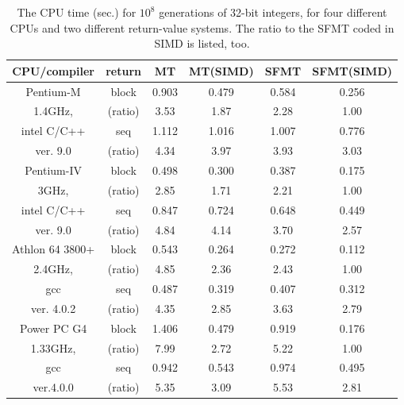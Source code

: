 \documentclass[acmnow]{acmtrans2m}
\begin{document}
\begin{table}
\begin{center}
\begin{tabular}{|c|c||c|c|c|c|}
\hline
CPU/compiler & return & MT & MT(SIMD) & SFMT & SFMT(SIMD)  \\ \hline \hline
Pentium-M  & block   & 0.903 & 0.479 & 0.584 &0.256  \\ 
\cline{3-6}
 1.4GHz, & (ratio) & 3.53\phantom{0}  & 1.87\phantom{0}  & 2.28\phantom{0}  & 1.00\phantom{0}\\ 
\cline{2-6}
 intel C/C++ &  seq     & 1.112 & 1.016 & 1.007 & 0.776 \\ 
\cline{3-6}
 ver. 9.0 & (ratio) & 4.34\phantom{0} & 3.97\phantom{0}  & 3.93\phantom{0}  & 3.03\phantom{0} \\ 
\hline
 Pentium-IV & block & 0.498 & 0.300 & 0.387 & 0.175 \\ 
\cline{3-6}
 3GHz, & (ratio)& 2.85\phantom{0} & 1.71\phantom{0}  & 2.21\phantom{0}
  & 1.00\phantom{0}  \\ 
\cline{2-6}
 intel C/C++ & seq   & 0.847 & 0.724 & 0.648 & 0.449 \\
\cline{3-6}
 ver. 9.0 & (ratio)& 4.84\phantom{0} & 4.14\phantom{0}  & 3.70\phantom{0}
  & 2.57\phantom{0}  \\ 
\hline
 Athlon 64 3800+& block & 0.543 & 0.264 & 0.272 & 0.112 \\
\cline{3-6}
 2.4GHz, & (ratio)& 4.85\phantom{0} & 2.36\phantom{0}  & 2.43\phantom{0} & 1.00\phantom{0} \\ 
\cline{2-6}
 gcc & seq & 0.487 & 0.319 & 0.407 & 0.312  \\ 
\cline{3-6}
 ver. 4.0.2 & (ratio)& 4.35\phantom{0} & 2.85\phantom{0}  & 3.63\phantom{0} & 2.79\phantom{0} \\ 
\hline
Power PC G4 & block & 1.406 & 0.479 & 0.919 & 0.176 \\ 
\cline{3-6}
1.33GHz, & (ratio)& 7.99\phantom{0} & 2.72\phantom{0}  & 5.22\phantom{0} & 1.00\phantom{0}\\ 
\cline{2-6}
 gcc & seq & 0.942 & 0.543 & 0.974 & 0.495 \\ 
\cline{3-6}
 ver.4.0.0 & (ratio)& 5.35\phantom{0} & 3.09\phantom{0} & 5.53\phantom{0} & 2.81\phantom{0} \\ 
\hline
\end{tabular}
\end{center}
\caption{The CPU time (sec.) for $10^8$ generations of 32-bit integers,
for four different CPUs and two different return-value systems. 
The ratio to the SFMT coded in SIMD is listed, too.}\label{tab:speed}
\end{table}
\end{document}
